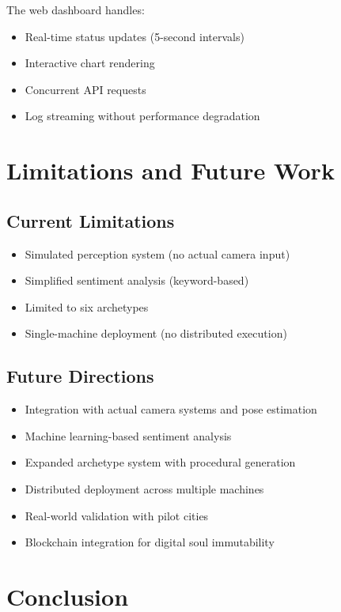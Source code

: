 \documentclass[12pt,a4paper]{article}
\begin{document}
\begin{itemize}
The web dashboard handles:
\begin{itemize}
    \item Real-time status updates (5-second intervals)
    \item Interactive chart rendering
    \item Concurrent API requests
    \item Log streaming without performance degradation
\end{itemize}

\section{Limitations and Future Work}

\subsection{Current Limitations}

\begin{itemize}
    \item Simulated perception system (no actual camera input)
    \item Simplified sentiment analysis (keyword-based)
    \item Limited to six archetypes
    \item Single-machine deployment (no distributed execution)
\end{itemize}

\subsection{Future Directions}

\begin{itemize}
    \item Integration with actual camera systems and pose estimation
    \item Machine learning-based sentiment analysis
    \item Expanded archetype system with procedural generation
    \item Distributed deployment across multiple machines
    \item Real-world validation with pilot cities
    \item Blockchain integration for digital soul immutability
\end{itemize}

\section{Conclusion}


\end{itemize}
\end{document}

